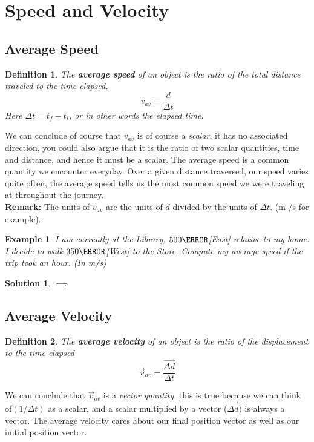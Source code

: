 \documentclass[12pt]{article}
\theoremstyle{break}
\newtheorem{ex}[thm]{Example}
\newtheorem*{soln}{Solution}
\newtheorem{defn}{Definition}[subsection]
\begin{document}
\let\ref\Cref
\section{Speed and Velocity}
\subsection{Average Speed}

\begin{defn}
The \textbf{average speed} of an object is the ratio of the total distance traveled to the time elapsed. 
$$v_{av} = \frac{d}{\Delta t}$$
Here $\Delta t = t_f - t_i$, or in other words the elapsed time.
\end{defn}
We can conclude of course that $v_{av}$ is of course a \emph{scalar}, it has no associated direction, you could also argue that it is the ratio of two scalar quantities, time and distance, and hence it must be a scalar. The average speed is a common quantity we encounter everyday. Over a given distance traversed, our speed varies quite often, the average speed tells us the most common speed we were traveling at throughout the journey. \\


\textbf{Remark:} The units of $v_{av}$ are the units of $d$ divided by the units of $\Delta t$. (m /s for example).
\begin{ex}
I am currently at the Library, $500\m$[East] relative to my home. I decide to walk $350\m$[West] to the Store. Compute my average speed if the trip took an hour. (In m/s)
\end{ex}
\begin{soln}
$\implies$
    \vspace*{9cm}
\end{soln}
   \newpage 

\subsection{Average Velocity}
    
\begin{defn}
    The \textbf{average velocity} of an object is the ratio of the displacement to the time elapsed
    $$\vec v_{av} = \frac{\overrightarrow{\Delta d}}{\Delta t}$$
\end{defn}
We can conclude that $\vec v_{av}$ is a \emph{vector quantity}, this is true because we can think of$(1 / \Delta t)$ as a scalar, and a scalar multiplied by a vector ($\overrightarrow{\Delta d})$ is always a vector. The average velocity cares about our final position vector as well as our initial position vector.
\end{document}
